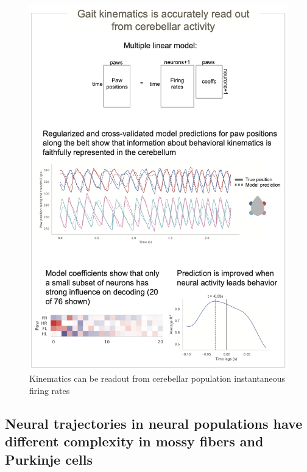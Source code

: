 \begin{figure}
    \centering
    \includegraphics[width=.9\linewidth]{Chapters/Figures/chapter5/npx_decoder.png}
    \caption{Kinematics can be readout from cerebellar population instantaneous firing rates}
    \label{fig:enter-label}
\end{figure}


\subsection{Neural trajectories in neural populations have different complexity in mossy fibers and Purkinje cells}

